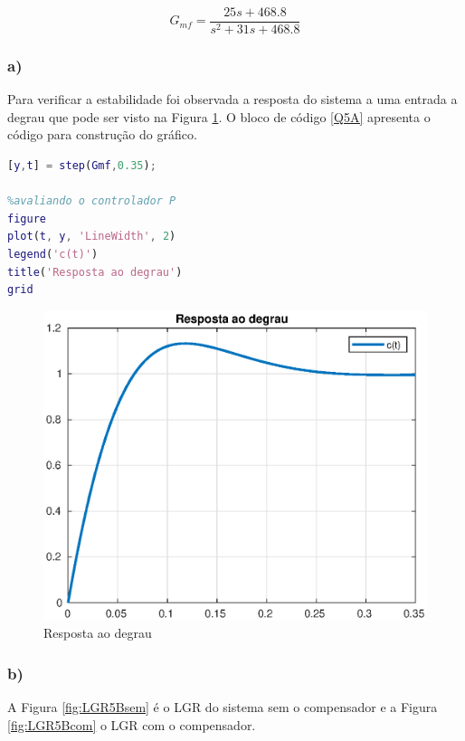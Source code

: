 \begin{equation}
    G_{mf} =  \frac{25 s + 468.8}{s^2 + 31 s + 468.8}
    \label{eq:Gmf5}
\end{equation}

\subsubsection*{a)}
Para verificar a estabilidade foi observada a resposta do sistema a uma entrada a degrau que pode ser visto na Figura 
\ref{fig:Q5A}. O bloco de código \ref{Q5A} apresenta o código para construção do gráfico.

\begin{lstlisting}[language=Matlab,label=Q5A,caption=Análise da estabilidade]
%step para avaliar a resp do sistema
[y,t] = step(Gmf,0.35);

%avaliando o controlador P
figure 
plot(t, y, 'LineWidth', 2)
legend('c(t)')
title('Resposta ao degrau')
grid
\end{lstlisting}

\begin{figure}[!ht]
    \centering
    \includegraphics[width = 0.75\linewidth]{Figuras/ProblemasPI/Problema5/step.eps}
    \caption{Resposta ao degrau}
    \label{fig:Q5A}                   
\end{figure}


\clearpage
\newpage
\subsubsection*{b)}
A Figura \ref{fig:LGR5Bsem} é o LGR do sistema sem o compensador e a Figura \ref{fig:LGR5Bcom} o LGR com o 
compensador.

